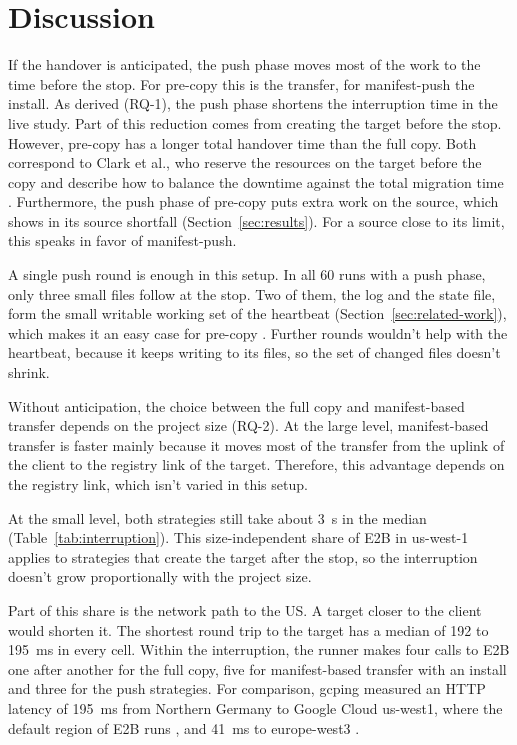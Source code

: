 \section{Discussion}
\label{sec:discussion}

If the handover is anticipated, the push phase moves most of the work to the time before the stop. For pre-copy this is the transfer, for manifest-push the install. As derived (RQ-1), the push phase shortens the interruption time in the live study. Part of this reduction comes from creating the target before the stop. However, pre-copy has a longer total handover time than the full copy. Both correspond to Clark et al., who reserve the resources on the target before the copy and describe how to balance the downtime against the total migration time \cite{clark2005live}. Furthermore, the push phase of pre-copy puts extra work on the source, which shows in its source shortfall (Section~\ref{sec:results}). For a source close to its limit, this speaks in favor of manifest-push.

A single push round is enough in this setup. In all 60 runs with a push phase, only three small files follow at the stop. Two of them, the log and the state file, form the small writable working set of the heartbeat (Section~\ref{sec:related-work}), which makes it an easy case for pre-copy \cite{clark2005live}. Further rounds wouldn't help with the heartbeat, because it keeps writing to its files, so the set of changed files doesn't shrink.

Without anticipation, the choice between the full copy and manifest-based transfer depends on the project size (RQ-2). At the large level, manifest-based transfer is faster mainly because it moves most of the transfer from the uplink of the client to the registry link of the target. Therefore, this advantage depends on the registry link, which isn't varied in this setup.

At the small level, both strategies still take about \SI{3}{\second} in the median (Table~\ref{tab:interruption}). This size-independent share of E2B in us-west-1 applies to strategies that create the target after the stop, so the interruption doesn't grow proportionally with the project size.

Part of this share is the network path to the US. A target closer to the client would shorten it. The shortest round trip to the target has a median of 192 to \SI{195}{\milli\second} in every cell. Within the interruption, the runner makes four calls to E2B one after another for the full copy, five for manifest-based transfer with an install and three for the push strategies. For comparison, gcping measured an HTTP latency of \SI{195}{\milli\second} from Northern Germany to Google Cloud us-west1, where the default region of E2B runs \cite{e2b-egress-2026}, and \SI{41}{\milli\second} to europe-west3 \cite{gcping-2026}.


